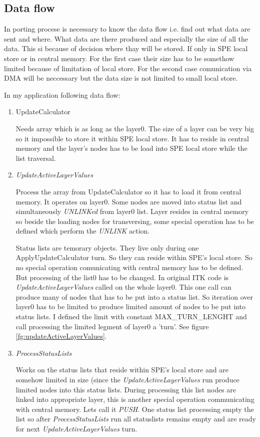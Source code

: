 \subsection{Data flow}

In porting procese is necessary to know the data flow i.e. find out what data are sent and where.
What data are there produced and especially the size of all the data.
This si because of decision where thay will be stored.
If only in SPE local store or in central memory.
For the first case their size has to be somethow limited because of limitation of local store.
For the second case comunication via DMA will be neccessary but the data size is not limited to small local store.

In my application following data flow:
\begin{enumerate}
\item UpdateCalculator
\par
Needs array which is as long as the layer0.
The size of a layer can be very big so it impossible to store it within SPE local store.
It has to reside in central memory and the layer's nodes has to be load into SPE local store while the list traversal.

\item \emph{UpdateActiveLayerValues}
\par
Process the array from UpdateCalculator so it has to load it from central memory.
It operates on layer0.
Some nodes are moved into status list and simultaneously \emph{UNLINKed} from layer0 list.
Layer resides in central memory so beside the loading nodes for transversing, some special operation has to be defined which perform the \emph{UNLINK} action.
\par
Status lists are temorary objects. They live only during one ApplyUpdateCalculator turn.
So they can reside within SPE's local store.
So no special operation comunicating with central memory has to be defined.
But processing of the list0 has to be changed.
In original ITK code is \emph{UpdateActiveLayerValues} called on the whole layer0.
This one call can produce many of nodes that has to be put into a status list.
So iteration over layer0 has to be limited to produce limited amount of nodes to be put into status lists.
I defined the limit with constant MAX\_TURN\_LENGHT and call processing the limited legment of layer0 a 'turn'.
See figure \ref{fg:updateActiveLayerValues}.

\item \emph{ProcessStatusLists}
\par
Works on the status lists that reside within SPE's local store and are somehow limited in size (since the \emph{UpdateActiveLayerValues} run produce limited nodes into this status lists.
During processing this list nodes are linked into appropriate layer, this is another special operation communicating with central memory.
Lets call it \emph{PUSH}.
One status list processing empty the list so after \emph{ProcessStatusLists} run all statuslists remains empty and are ready for next \emph{UpdateActiveLayerValues} turn.


\end{enumerate}
